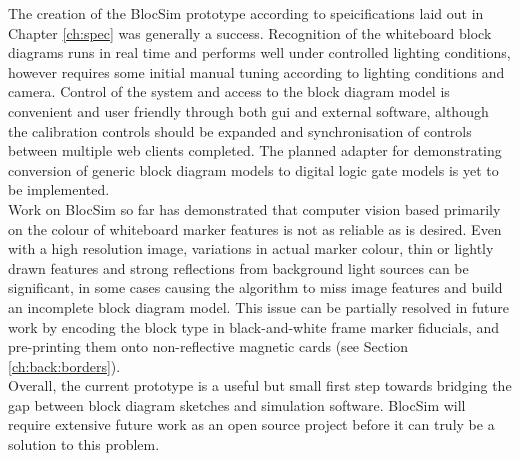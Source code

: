The creation of the BlocSim prototype according to speicifications laid out in Chapter \ref{ch:spec} was generally a success. Recognition of the whiteboard block diagrams runs in real time and performs well under controlled lighting conditions, however requires some initial manual tuning according to lighting conditions and camera. Control of the system and access to the block diagram model is convenient and user friendly through both \gls{gui} and external software, although the calibration controls should be expanded and synchronisation of controls between multiple web clients completed. The planned adapter for demonstrating conversion of generic block diagram models to digital logic gate models is yet to be implemented.
\\

Work on BlocSim so far has demonstrated that computer vision based primarily on the colour of whiteboard marker features is not as reliable as is desired. Even with a high resolution image, variations in actual marker colour, thin or lightly drawn features and strong reflections from background light sources can be significant, in some cases causing the algorithm to miss image features and build an incomplete block diagram model. This issue can be partially resolved in future work by encoding the block type in black-and-white frame marker fiducials, and pre-printing them onto non-reflective magnetic cards (see Section \ref{ch:back:borders}).
\\

Overall, the current prototype is a useful but small first step towards bridging the gap between block diagram sketches and simulation software. BlocSim will require extensive future work as an open source project before it can truly be a solution to this problem.


\begin{comment}

\end{comment}
